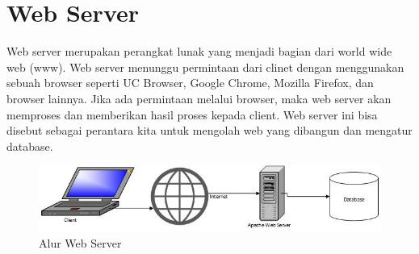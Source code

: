 \section{Web Server}
Web server merupakan perangkat lunak yang menjadi bagian dari world wide web (www). Web server menunggu permintaan dari clinet dengan menggunakan sebuah browser seperti UC Browser, Google Chrome, Mozilla Firefox, dan browser lainnya. Jika ada permintaan melalui browser, maka web server akan memproses dan memberikan hasil proses kepada client. Web server ini bisa disebut sebagai perantara kita untuk mengolah web yang dibangun dan mengatur database. 

\begin{figure}[h]
\centering
\includegraphics[scale=0.7]{figures/Alur-Web-Server}
\caption{Alur Web Server}
\label{webserver}
\end{figure}